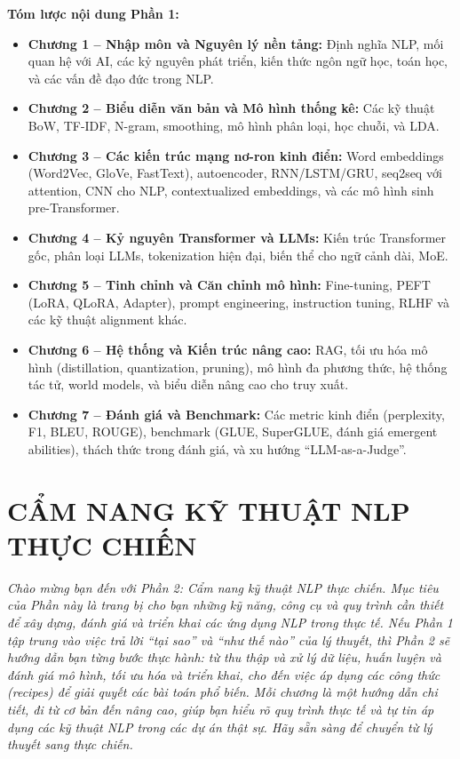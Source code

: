 \documentclass[11pt, a4paper, twoside]{book}
\begin{document}
\noindent
\textbf{Tóm lược nội dung Phần 1:}
\begin{itemize}
    \item \textbf{Chương 1 – Nhập môn và Nguyên lý nền tảng:} 
    Định nghĩa NLP, mối quan hệ với AI, các kỷ nguyên phát triển, 
    kiến thức ngôn ngữ học, toán học, và các vấn đề đạo đức trong NLP.
    \item \textbf{Chương 2 – Biểu diễn văn bản và Mô hình thống kê:} 
    Các kỹ thuật BoW, TF-IDF, N-gram, smoothing, 
    mô hình phân loại, học chuỗi, và LDA.
    \item \textbf{Chương 3 – Các kiến trúc mạng nơ-ron kinh điển:} 
    Word embeddings (Word2Vec, GloVe, FastText), 
    autoencoder, RNN/LSTM/GRU, seq2seq với attention, 
    CNN cho NLP, contextualized embeddings, và các mô hình sinh pre-Transformer.
    \item \textbf{Chương 4 – Kỷ nguyên Transformer và LLMs:} 
    Kiến trúc Transformer gốc, phân loại LLMs, tokenization hiện đại, 
    biến thể cho ngữ cảnh dài, MoE.
    \item \textbf{Chương 5 – Tinh chỉnh và Căn chỉnh mô hình:} 
    Fine-tuning, PEFT (LoRA, QLoRA, Adapter), prompt engineering, 
    instruction tuning, RLHF và các kỹ thuật alignment khác.
    \item \textbf{Chương 6 – Hệ thống và Kiến trúc nâng cao:} 
    RAG, tối ưu hóa mô hình (distillation, quantization, pruning), 
    mô hình đa phương thức, hệ thống tác tử, world models, 
    và biểu diễn nâng cao cho truy xuất.
    \item \textbf{Chương 7 – Đánh giá và Benchmark:} 
    Các metric kinh điển (perplexity, F1, BLEU, ROUGE), 
    benchmark (GLUE, SuperGLUE, đánh giá emergent abilities), 
    thách thức trong đánh giá, và xu hướng “LLM-as-a-Judge”.
\end{itemize}

\part{CẨM NANG KỸ THUẬT NLP THỰC CHIẾN}
\setcounter{chapter}{0}
\textit{Chào mừng bạn đến với Phần 2: Cẩm nang kỹ thuật NLP thực chiến. Mục tiêu của Phần này là trang bị cho bạn những kỹ năng, công cụ và quy trình cần thiết để xây dựng, đánh giá và triển khai các ứng dụng NLP trong thực tế. Nếu Phần 1 tập trung vào việc trả lời ``tại sao'' và ``như thế nào'' của lý thuyết, thì Phần 2 sẽ hướng dẫn bạn từng bước thực hành: từ thu thập và xử lý dữ liệu, huấn luyện và đánh giá mô hình, tối ưu hóa và triển khai, cho đến việc áp dụng các công thức (recipes) để giải quyết các bài toán phổ biến. Mỗi chương là một hướng dẫn chi tiết, đi từ cơ bản đến nâng cao, giúp bạn hiểu rõ quy trình thực tế và tự tin áp dụng các kỹ thuật NLP trong các dự án thật sự. Hãy sẵn sàng để chuyển từ lý thuyết sang thực chiến.}
\end{document}
